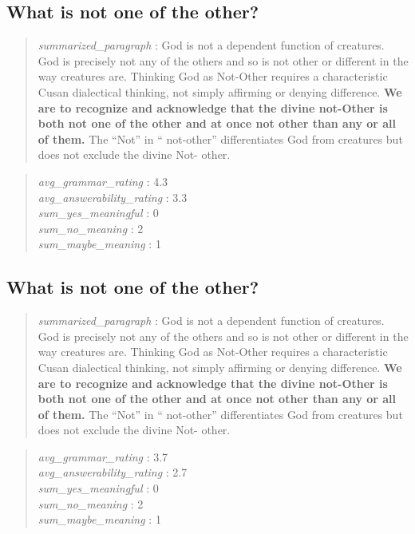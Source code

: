 \hypertarget{what-is-not-one-of-the-other}{%
\subsection{What is not one of the
other?}\label{what-is-not-one-of-the-other}}

\begin{quote}
\emph{summarized\_paragraph} : God is not a dependent function of
creatures. God is precisely not any of the others and so is not other or
different in the way creatures are. Thinking God as Not-Other requires a
characteristic Cusan dialectical thinking, not simply affirming or
denying difference. \textbf{We are to recognize and acknowledge that the
divine not-Other is both not one of the other and at once not other than
any or all of them.} The ``Not'' in `` not-other'' differentiates God
from creatures but does not exclude the divine Not- other.
\end{quote}

\begin{quote}
\emph{avg\_grammar\_rating} : 4.3\\
\emph{avg\_answerability\_rating} : 3.3\\
\emph{sum\_yes\_meaningful} : 0\\
\emph{sum\_no\_meaning} : 2\\
\emph{sum\_maybe\_meaning} : 1
\end{quote}

\hypertarget{what-is-not-one-of-the-other-1}{%
\subsection{What is not one of the
other?}\label{what-is-not-one-of-the-other-1}}

\begin{quote}
\emph{summarized\_paragraph} : God is not a dependent function of
creatures. God is precisely not any of the others and so is not other or
different in the way creatures are. Thinking God as Not-Other requires a
characteristic Cusan dialectical thinking, not simply affirming or
denying difference. \textbf{We are to recognize and acknowledge that the
divine not-Other is both not one of the other and at once not other than
any or all of them.} The ``Not'' in `` not-other'' differentiates God
from creatures but does not exclude the divine Not- other.
\end{quote}

\begin{quote}
\emph{avg\_grammar\_rating} : 3.7\\
\emph{avg\_answerability\_rating} : 2.7\\
\emph{sum\_yes\_meaningful} : 0\\
\emph{sum\_no\_meaning} : 2\\
\emph{sum\_maybe\_meaning} : 1
\end{quote}
